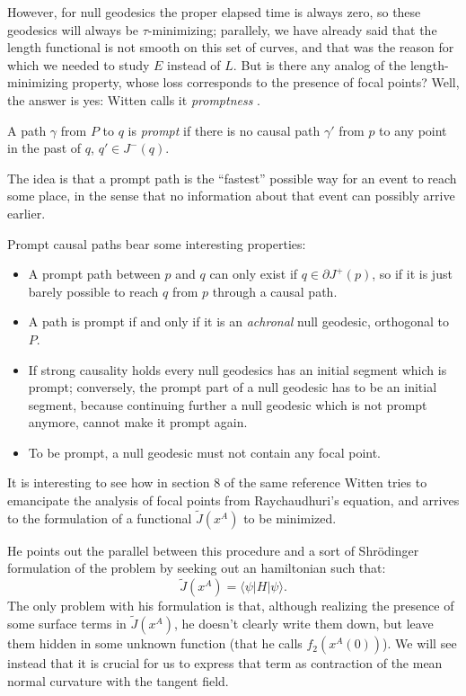 However, for null geodesics the proper elapsed time is always zero, so these geodesics will always be \(\tau\)-minimizing; parallely, we have already said that the length functional is not smooth on this set of curves, and that was the reason for which we needed to study \(E\) instead of \(L\). But is there any analog of the length-minimizing property, whose loss corresponds to the presence of focal points? Well, the answer is yes: Witten calls it \emph{promptness} \cite{witten2020light}.

\begin{definition}
	A path \(\gamma\) from \(P\) to \(q\) is \emph{prompt} if there is no causal path \(\gamma'\) from \(p\) to any point in the past of \(q\), \(q'\in J^-(q)\).
\end{definition}

The idea is that a prompt path is the ``fastest'' possible way for an event to reach some place, in the sense that no information about that event can possibly arrive earlier.

Prompt causal paths bear some interesting properties:
\begin{itemize}
	\item[\ding{99}] A prompt path between \(p\) and \(q\) can only exist if \(q\in\partial J^+(p)\), so if it is just barely possible to reach \(q\) from \(p\) through a causal path.
	\item[\ding{99}] A path is prompt if and only if it is an \emph{achronal} null geodesic, orthogonal to \(P\).
	\item[\ding{99}] If strong causality holds every null geodesics has an initial segment which is prompt; conversely, the prompt part of a null geodesic has to be an initial segment, because continuing further a null geodesic which is not prompt anymore, cannot make it prompt again.
	\item[\ding{99}] To be prompt, a null geodesic must not contain any focal point.
\end{itemize}

It is interesting to see how in section \(8\) of the same reference Witten tries to emancipate the analysis of focal points from Raychaudhuri's equation, and arrives to the formulation of a functional \(\tilde{J}(x^A)\) to be minimized.

He points out the parallel between this procedure and a sort of Shr\"odinger formulation of the problem by seeking out an hamiltonian such that:
\[
	\tilde{J}(x^A) = \langle \psi \vert H \vert \psi \rangle.	
\]
The only problem with his formulation is that, although realizing the presence of some surface terms in \(\tilde{J}(x^A)\), he doesn't clearly write them down, but leave them hidden in some unknown function (that he calls \(f_2(x^A(0))\)). We will see instead that it is crucial for us to express that term as contraction of the mean normal curvature with the tangent field.
